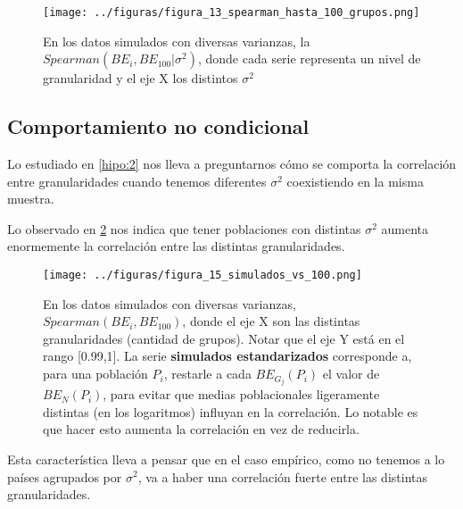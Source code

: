 \begin{figure}[H]
    \centering 
    \texttt{[image: ../figuras/figura\_13\_spearman\_hasta\_100\_grupos.png]} 
    \caption{En los datos simulados con diversas varianzas, la $Spearman(BE_i,BE_{100} | \sigma^2)$, donde cada serie representa un nivel de granularidad y el eje X los distintos $\sigma^2$}
    \label{fig:13}
\end{figure}



\subsection{Comportamiento no condicional}

Lo estudiado en \ref{hipo:2} nos lleva a preguntarnos cómo se comporta la correlación entre granularidades cuando tenemos diferentes $\sigma^2$ coexistiendo en la misma muestra.

Lo observado en \ref{fig:15} nos indica que tener poblaciones con distintas $\sigma^2$ aumenta enormemente la correlación entre las distintas granularidades.

\begin{figure}[H]
    \centering 
    \texttt{[image: ../figuras/figura\_15\_simulados\_vs\_100.png]} 
    \caption{En los datos simulados con diversas varianzas, $Spearman(BE_i,BE_{100})$, donde el eje X son las distintas granularidades (cantidad de grupos). Notar que el eje Y está en el rango [0.99,1]. La serie \textbf{simulados estandarizados} corresponde a, para una población $P_i$, restarle a cada $BE_{G_j}(P_i)$ el valor de $BE_N(P_i)$, para evitar que medias poblacionales ligeramente distintas (en los logaritmos) influyan en la correlación. Lo notable es que hacer esto aumenta la correlación en vez de reducirla.}
    \label{fig:15}
\end{figure}

Esta característica lleva a pensar que en el caso empírico, como no tenemos a lo países agrupados por $\sigma^2$, va a haber una correlación fuerte entre las distintas granularidades. 